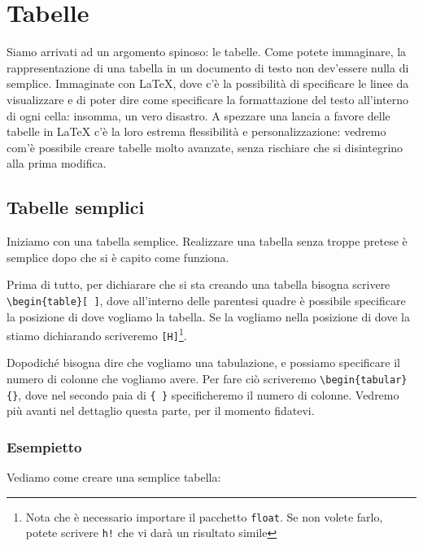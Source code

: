 \section{Tabelle}

Siamo arrivati ad un argomento spinoso: le tabelle. Come potete immaginare, la 
rappresentazione di una tabella in un documento di testo non dev'essere nulla 
di semplice. Immaginate con \LaTeX{}, dove c'è la possibilità di specificare le 
linee da visualizzare e di poter dire come specificare la formattazione del 
testo all'interno di ogni cella: insomma, un vero disastro.
A spezzare una lancia a favore delle tabelle in \LaTeX{} c'è la loro estrema 
flessibilità e personalizzazione: vedremo com'è possibile creare tabelle molto 
avanzate, senza rischiare che si disintegrino alla prima modifica.

\subsection{Tabelle semplici}

Iniziamo con una tabella semplice. Realizzare una tabella senza troppe pretese 
è semplice dopo che si è capito come funziona.

Prima di tutto, per dichiarare che si sta creando una tabella bisogna scrivere
\verb!\begin{table}[ ]!, dove all'interno delle parentesi quadre è possibile 
specificare la posizione di dove vogliamo la tabella. Se la vogliamo nella 
posizione di dove la stiamo dichiarando scriveremo \verb![H]!\footnote{Nota 
che è necessario importare il pacchetto \texttt{float}. Se non volete farlo, 
potete scrivere \texttt{h!} che vi darà un risultato simile}.

Dopodiché bisogna dire che vogliamo una tabulazione, e possiamo specificare il 
numero di colonne che vogliamo avere. Per fare ciò scriveremo 
\verb!\begin{tabular}{}!, dove nel secondo paia di \verb!{ }! specificheremo il 
numero di colonne. Vedremo più avanti nel dettaglio questa parte, per il 
momento fidatevi.

\vspace{\abovedisplayskip}
\begin{minipage}{\linewidth}
  \subsubsection{Esempietto}
  
  Vediamo come creare una semplice tabella:
  


\end{minipage}
\vspace{\belowdisplayskip}


